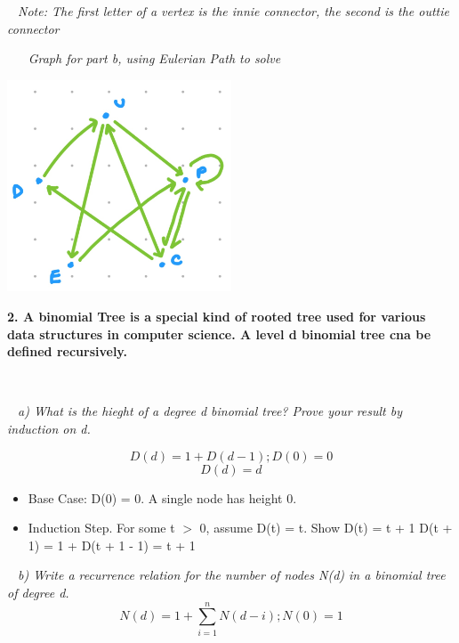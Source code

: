 \documentclass[12pt, letterpaper]{article}
\begin{document}
\-\ \it{ Note: The first letter of a vertex is the innie connector, the second is the outtie connector }

\-\ \newline \newline
\-\ \it{ Graph for part b, using Eulerian Path to solve } \newline
\begin{center}
\includegraphics[width=0.5\textwidth]{graph2.jpeg}
\end{center}


\newpage

\bf{ 2. A binomial Tree is a special kind of rooted tree used for various data structures in computer science. A level d binomial tree cna be defined recursively. }

\-\ \newline

\-\ \it{ a) What is the hieght of a degree d binomial tree? Prove your result by induction on d. } 

\[ D(d) = 1 + D(d - 1); D(0) = 0\]
\[ D(d) = d \]

\begin{itemize}
  \item \textnormal{Base Case:} \newline  
  \textnormal{D(0) = 0. A single node has height 0.} \newline

  \item \textnormal{Induction Step. For some t \(>\) 0, assume D(t) = t. Show D(t) = t + 1} \newline
  \textnormal{D(t + 1) = 1 + D(t + 1 - 1) = t + 1}
\end{itemize}

\-\ \it{ b) Write a recurrence relation for the number of nodes N(d) in a binomial tree of degree d. }
\[ N(d) = 1 + \sum_{i = 1}^{n} N(d - i); N(0) = 1 \]
\end{document}
